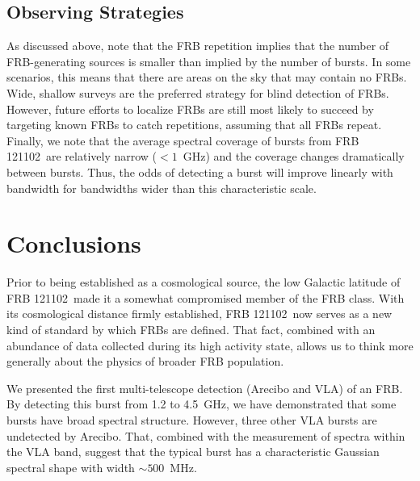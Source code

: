 \documentclass[twocolumn]{aastex61}
\newcommand{\frb}{FRB 121102}
\begin{document}
\subsection{Observing Strategies}
As discussed above, \citet{2016MNRAS.458L..89C} note that the FRB repetition implies that the number of FRB-generating sources is smaller than implied by the number of bursts. In some scenarios, this means that there are areas on the sky that may contain no FRBs. Wide, shallow surveys are the preferred strategy for blind detection of FRBs. However, future efforts to localize FRBs are still most likely to succeed by targeting known FRBs to catch repetitions, assuming that all FRBs repeat. Finally, we note that the average spectral coverage of bursts from \frb\ are relatively narrow ($<1$~GHz) and the coverage changes dramatically between bursts. Thus, the odds of detecting a burst will improve linearly with bandwidth for bandwidths wider than this characteristic scale.


\section{Conclusions}
Prior to being established as a cosmological source, the low Galactic latitude of \frb\ made it a somewhat compromised member of the FRB class. With its cosmological distance firmly established, \frb\ now serves as a new kind of standard by which FRBs are defined. That fact, combined with an abundance of data collected during its high activity state, allows us to think more generally about the physics of broader FRB population.

We presented the first multi-telescope detection (Arecibo and VLA) of an FRB. By detecting this burst from 1.2 to 4.5~GHz, we have demonstrated that some bursts have broad spectral structure. However, three other VLA bursts are undetected by Arecibo. That, combined with the measurement of spectra within the VLA band, suggest that the typical burst has a characteristic Gaussian spectral shape with width $\sim500$\ MHz.
\end{document}
